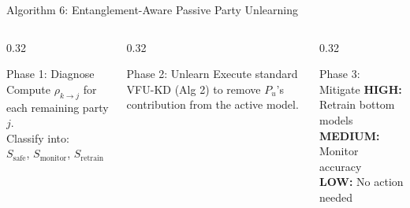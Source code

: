 \documentclass[aspectratio=169, 11pt]{beamer}
\begin{document}
\begin{frame}{Algorithm 6: Entanglement-Aware Passive Party Unlearning}
  \begin{center}
  \end{center}
  \vspace{0.3cm}
  \begin{columns}[T]
    \begin{column}{0.32\textwidth}
      \begin{block}{Phase 1: Diagnose}
        Compute $\rho_{k \to j}$ for each remaining party $j$.\\
        Classify into:\\
        $S_{\text{safe}}$, $S_{\text{monitor}}$, $S_{\text{retrain}}$
      \end{block}
    \end{column}
    \begin{column}{0.32\textwidth}
      \begin{block}{Phase 2: Unlearn}
        Execute standard VFU-KD (Alg 2) to remove $P_u$'s contribution from the active model.
      \end{block}
    \end{column}
    \begin{column}{0.32\textwidth}
      \begin{block}{Phase 3: Mitigate}
        \textbf{HIGH:} Retrain bottom models\\
        \textbf{MEDIUM:} Monitor accuracy\\
        \textbf{LOW:} No action needed
      \end{block}
    \end{column}
  \end{columns}
\end{frame}
\end{document}
